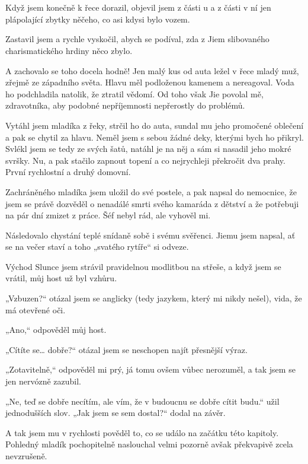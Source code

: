 \chapter{}

Když jsem konečně k řece dorazil, objevil jsem z části u a z části v ní jen plápolající zbytky něčeho, co asi kdysi bylo vozem.

Zastavil jsem a rychle vyskočil, abych se podíval, zda z Jiem slibovaného charismatického hrdiny něco zbylo.

A zachovalo se toho docela hodně! Jen malý kus od auta ležel v řece mladý muž, zřejmě ze západního světa. Hlavu měl podloženou kamenem a nereagoval. Voda ho podchladila natolik, že ztratil vědomí. Od toho však Jie povolal mě, zdravotníka, aby podobné nepříjemnosti nepřerostly do problémů.

Vytáhl jsem mladíka z řeky, strčil ho do auta, sundal mu jeho promočené oblečení a pak se chytil za hlavu. Neměl jsem s sebou žádné deky, kterými bych ho přikryl. Svlékl jsem se tedy ze svých šatů, natáhl je na něj a sám si nasadil jeho mokré svršky. Nu, a pak stačilo zapnout topení a co nejrychleji překročit dva prahy. První rychlostní a druhý domovní.  

Zachráněného mladíka jsem uložil do své postele, a pak napsal do nemocnice, že jsem se právě dozvěděl o nenadálé smrti svého kamaráda z dětství a že potřebuji na pár dní zmizet z práce. Šéf nebyl rád, ale vyhověl mi.

Následovalo chystání teplé snídaně sobě i svému svěřenci. Jiemu jsem napsal, ať se na večer staví a toho „svatého rytíře“ si odveze.
\vspace{0.75cm}

Východ Slunce jsem strávil pravidelnou modlitbou na střeše, a když jsem se vrátil, můj host už byl vzhůru.

„Vzbuzen?“ otázal jsem se anglicky (tedy jazykem, který mi nikdy nešel), vida, že má otevřené oči.

„Ano,“ odpověděl můj host.

„Cítíte se… dobře?“ otázal jsem se neschopen najít přesnější výraz.

„Zotavitelně,“ odpověděl mi prý, já tomu ovšem vůbec nerozuměl, a tak jsem se jen nervózně zazubil.

„Ne, teď se dobře necítím, ale vím, že v budoucnu se dobře cítit budu.“ užil jednodušších slov. „Jak jsem se sem dostal?“ dodal na závěr.

A tak jsem mu v rychlosti pověděl to, co se událo na začátku této kapitoly. Pohledný mladík pochopitelně naslouchal velmi pozorně avšak překvapivě zcela nevzrušeně.

